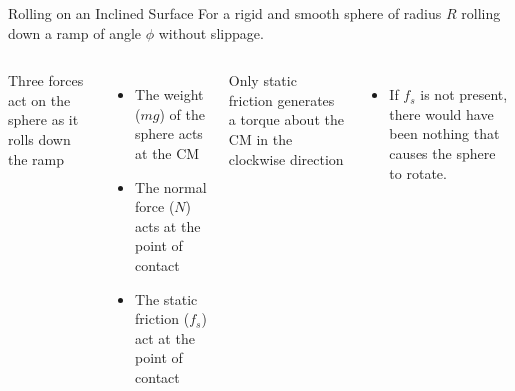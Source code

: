 \documentclass[12pt,compress,aspectratio=169]{beamer}
\begin{document}
\begin{frame}{Rolling on an Inclined Surface}
  For a rigid and smooth sphere of radius $R$ rolling down a ramp of angle
  $\phi$ without slippage.

  \vspace{.2in}
  \begin{columns}

    Three forces act on the sphere as it rolls down the ramp
    \begin{itemize}
    \item The weight ($mg$) of the sphere acts at the CM
    \item The normal force ($N$) acts at the point of contact
    \item The static friction ($f_s$) act at the point of contact
    \end{itemize}
    Only static friction generates a torque about the CM in the clockwise
    direction
    \begin{itemize}
    \item If $f_s$ is not present, there would have been nothing that causes
      the sphere to rotate.
    \end{itemize}
  \end{columns}
\end{frame}
\end{document}

